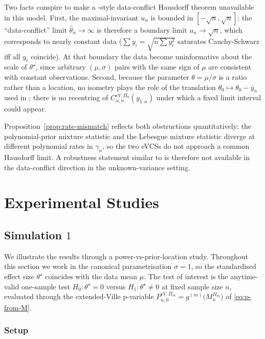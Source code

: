 \documentclass[12pt, a4paper]{report}
\newcommand{\1}{\mathbf{1}}
\begin{document}
\begin{remark}\label{rem:why-no-data-conflict}
Two facts conspire to make a \cite{Cortinovis2025}-style data-conflict Hausdorff theorem unavailable in this model. First, the maximal-invariant \(u_n\) is bounded in \([-\sqrt n,\sqrt n]\): the ``data-conflict'' limit \(\widehat\theta_n\to\infty\) is therefore a boundary limit \(u_n\to\sqrt n\), which corresponds to nearly constant data (\(\sum y_i=\sqrt{n\sum y_i^2}\) saturates Cauchy-Schwarz iff all \(y_i\) coincide). At that boundary the data
become uninformative about the scale of \(\theta^\star\), since arbitrary \((\mu,\sigma)\) pairs with the same sign of \(\mu\) are consistent with constant observations. Second, because the parameter \(\theta=\mu/\sigma\) is a ratio rather than a location, no isometry plays the role of the translation
\(\theta_0\mapsto\theta_0-\bar y_n\) used in \cite[Theorem~4.3]{Cortinovis2025}; there is no recentring of \(C^{eV,\Pi_0}_{\alpha,n}(y_{1:n})\) under which a fixed limit interval could appear.

Proposition~\ref{prop:rate-mismatch} reflects both obstructions quantitatively: the polynomial-prior mixture statistic and the Lebesgue mixture statistic diverge at different polynomial rates in \(\gamma_n\), so the two eVCSs do not approach a common Hausdorff limit. A robustness statement similar to \cite{Cortinovis2025} is therefore not available in the data-conflict direction in the unknown-variance setting.
\end{remark}

\section{Experimental Studies}
\subsection{Simulation $1$}\label{sec:sim1}
We illustrate the results through a power-vs-prior-location study. Throughout this section we work in the
canonical parametrisation \(\sigma=1\), so the standardised effect
size \(\theta^\star\) coincides with the data mean \(\mu\). The test
of interest is the anytime-valid one-sample test
\(H_0:\theta^\star=0\) versus \(H_1:\theta^\star\neq 0\) at fixed
sample size \(n\), evaluated through the extended-Ville p-variable
\(P_{n,0}^{eV,\Pi_m}=g^{(m)}\bigl(M_n^{\Pi_m}\bigr)\) of
\eqref{eq:p-from-M}.


\subsubsection{Setup}\label{ssec:exp-setup}
\end{document}

